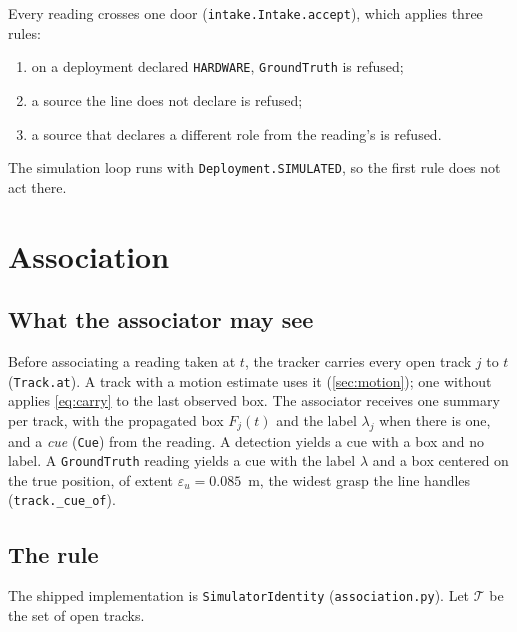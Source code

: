 \documentclass[11pt,a4paper]{article}
\theoremstyle{definition}
\theoremstyle{remark}
\newcommand{\code}[1]{\texttt{#1}}
\begin{document}
Every reading crosses one door (\code{intake.Intake.accept}), which applies
three rules:
\begin{enumerate}[leftmargin=*]
\item on a deployment declared \code{HARDWARE}, \code{GroundTruth} is refused;
\item a source the line does not declare is refused;
\item a source that declares a different role from the reading's is refused.
\end{enumerate}
The simulation loop runs with \code{Deployment.SIMULATED}, so the first rule
does not act there.

\section{Association}
\label{sec:association}

\subsection{What the associator may see}

Before associating a reading taken at $t$, the tracker carries every open track
$j$ to $t$ (\code{Track.at}). A track with a motion estimate uses it
(\cref{sec:motion}); one without applies \eqref{eq:carry} to the last observed
box. The associator receives one summary per track, with the propagated box
$F_j(t)$ and the label $\lambda_j$ when there is one, and a \emph{cue}
(\code{Cue}) from the reading. A detection yields a cue with a box and no label.
A \code{GroundTruth} reading yields a cue with the label $\lambda$ and a box
centered on the true position, of extent $\varepsilon_u = 0.085$~m, the widest
grasp the line handles (\code{track.\_cue\_of}).

\subsection{The rule}

The shipped implementation is \code{SimulatorIdentity} (\code{association.py}).
Let $\mathcal{T}$ be the set of open tracks.
\end{document}

